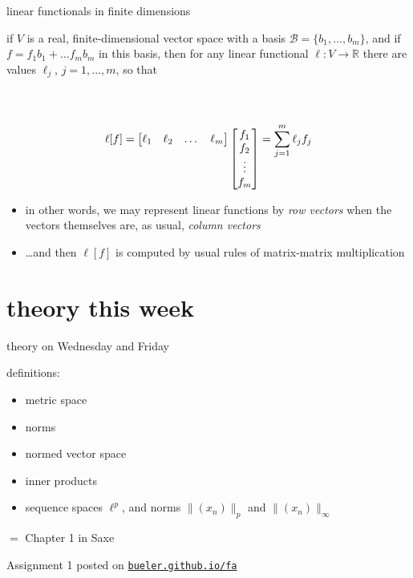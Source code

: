 \documentclass[10pt,
               svgnames,
               hyperref={colorlinks,citecolor=DeepPink4,linkcolor=FireBrick,urlcolor=Maroon},
               usepdftitle=false]{beamer}
\newcommand{\RR}{\mathbb{R}}
\begin{document}
\begin{frame}{linear functionals in finite dimensions}

\begin{theorem}
if $V$ is a real, finite-dimensional vector space with a basis $\mathcal{B} = \{b_1,\dots,b_m\}$, and if $f = f_1 b_1 + \dots f_m b_m$ in this basis, then for any linear functional $\ell:V \to \RR$ there are values $\ell_j$, $j=1,\dots,m$, so that

\vspace{-10mm}
	$$\ell[f] = \begin{bmatrix} \ell_1 & \ell_2 & \dots & \ell_m \end{bmatrix}\begin{matrix} \vspace{8mm} \\ \begin{bmatrix} f_1 \\ f_2 \\ \vdots \\ f_m \end{bmatrix} \end{matrix} = \sum_{j=1}^m \ell_j f_j$$

\smallskip
\end{theorem}

\begin{itemize}
\item in other words, we may represent linear functions by \emph{row vectors} when the vectors themselves are, as usual, \emph{column vectors}
\item \dots and then $\ell[f]$ is computed by usual rules of matrix-matrix multiplication
\end{itemize}
\end{frame}


\section{theory this week}

\begin{frame}{theory on Wednesday and Friday}

\noindent definitions:
\begin{itemize}
\item metric space
\item norms
\item normed vector space
\item inner products
\item sequence spaces $\ell^p$, and norms $\|(x_n)\|_p$ and $\|(x_n)\|_\infty$
\end{itemize}


\bigskip
\noindent $=$ Chapter 1 in Saxe

\bigskip
\noindent Assignment 1 posted on \href{https://bueler.github.io/fa/index.html}{\texttt{bueler.github.io/fa}}
\end{frame}
\end{document}
